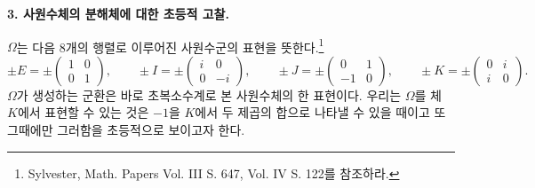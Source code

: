 \documentclass[11pt]{article}
\newcommand{\mat}[1]{\begin{pmatrix}#1\end{pmatrix}}
\begin{document}
\begin{center}
\textbf{3. 사원수체의 분해체에 대한 초등적 고찰.}
\end{center}

$\Omega$는 다음 8개의 행렬로 이루어진 사원수군의 표현을 뜻한다.\footnote{Sylvester, Math. Papers Vol. III S. 647, Vol. IV S. 122를 참조하라.}
\[
\pm E=\pm\mat{1&0\\0&1},\qquad
\pm I=\pm\mat{i&0\\0&-i},\qquad
\pm J=\pm\mat{0&1\\-1&0},\qquad
\pm K=\pm\mat{0&i\\ i&0}.
\]
$\Omega$가 생성하는 군환은 바로 초복소수계로 본 사원수체의 한 표현이다. 우리는 $\Omega$를 체 $K$에서 표현할 수 있는 것은 $-1$을 $K$에서 두 제곱의 합으로 나타낼 수 있을 때이고 또 그때에만 그러함을 초등적으로 보이고자 한다.
\end{document}
